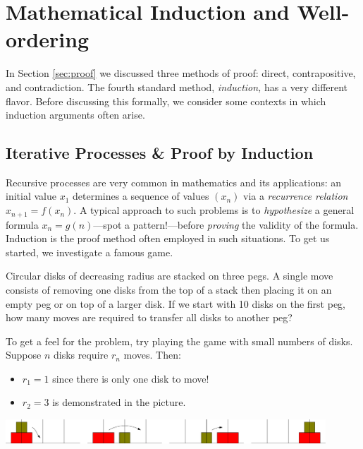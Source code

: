 \graphicspath{{5induction/asy/}}
\section{Mathematical Induction and Well-ordering}\label{chap:induction}

In Section \ref{sec:proof} we discussed three methods of proof: direct, contrapositive, and contradiction. The fourth standard method, \emph{induction,} has a very different flavor. Before discussing this formally, we consider some contexts in which induction arguments often arise.

\subsection{Iterative Processes \& Proof by Induction}\label{sec:induction}

Recursive processes are very common in mathematics and its applications: an initial value $x_1$ determines a sequence of values $(x_n)$ via a \emph{recurrence relation} $x_{n+1}=f(x_n)$. A typical approach to such problems is to \emph{hypothesize} a general formula $x_n=g(n)$---spot a pattern!---before \emph{proving} the validity of the formula. Induction is the proof method often employed in such situations. To get us started, we investigate a famous game.



Circular disks of decreasing radius are stacked on three pegs. A single move consists of removing one disks from the top of a stack then placing it on an empty peg or on top of a larger disk. If we start with 10 disks on the first peg, how many moves are required to transfer all disks to another peg?\smallbreak

To get a feel for the problem, try playing the game with small numbers of disks. Suppose $n$ disks require $r_n$ moves. Then:
\begin{itemize}\itemsep0pt
  \item $r_1=1$ since there is only one disk to move!
  \item $r_2=3$ is demonstrated in the picture.
\end{itemize} 

\begin{center}
	\includegraphics[width=0.9\textwidth]{induction-03-hanoi2}
\end{center}

